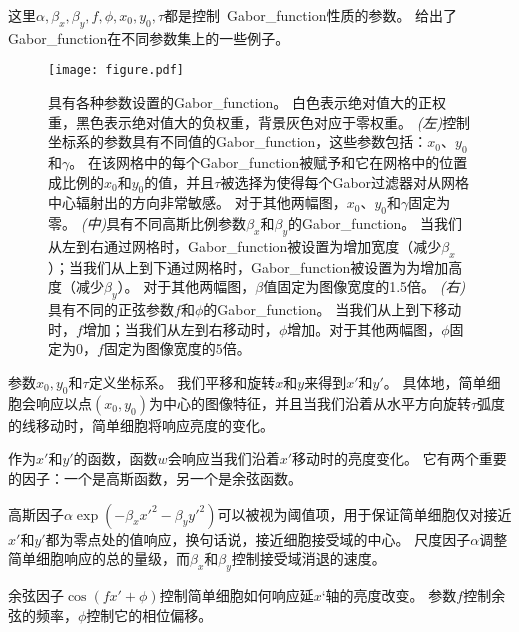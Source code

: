 这里$\alpha, \beta_x, \beta_y, f, \phi, x_0, y_0, \tau$都是控制~\gls{Gabor_function}性质的参数。
给出了\gls{Gabor_function}在不同参数集上的一些例子。
\begin{figure}
\ifOpenSource
\centerline{\texttt{[image: figure.pdf]}}
\else
\centering    
{}     
\fi
\captionsetup{singlelinecheck=off}
\caption{具有各种参数设置的\gls{Gabor_function}。
白色表示绝对值大的正权重，黑色表示绝对值大的负权重，背景灰色对应于零权重。
\emph{(左)}控制坐标系的参数具有不同值的\gls{Gabor_function}，这些参数包括：$x_0$、$y_0$和$\gamma$。
在该网格中的每个\gls{Gabor_function}被赋予和它在网格中的位置成比例的$x_0$和$y_0$的值，并且$\tau$被选择为使得每个Gabor过滤器对从网格中心辐射出的方向非常敏感。
对于其他两幅图，$x_0$、$y_0$和$\gamma$固定为零。
\emph{(中)}具有不同高斯比例参数$\beta_x$和$\beta_y$的\gls{Gabor_function}。
当我们从左到右通过网格时，\gls{Gabor_function}被设置为增加宽度（减少$\beta_x$）；当我们从上到下通过网格时，\gls{Gabor_function}被设置为为增加高度（减少$\beta_y$）。
对于其他两幅图，$\beta$值固定为图像宽度的1.5倍。
\emph{(右)}具有不同的正弦参数$f$和$\phi$的\gls{Gabor_function}。
当我们从上到下移动时，$f$增加；当我们从左到右移动时，$\phi$增加。对于其他两幅图，$\phi$固定为0，$f$固定为图像宽度的5倍。}     
\label{fig:chap9_Gabor_functions}     
\end{figure}

参数$x_0,y_0$和$\tau$定义坐标系。
我们平移和旋转$x$和$y$来得到$x'$和$y'$。
具体地，简单细胞会响应以点$(x_0, y_0)$为中心的图像特征，并且当我们沿着从水平方向旋转$\tau$弧度的线移动时，简单细胞将响应亮度的变化。
 
 
作为$x'$和$y'$的函数，函数$w$会响应当我们沿着$x'$移动时的亮度变化。
它有两个重要的因子：一个是高斯函数，另一个是余弦函数。

高斯因子$ \alpha \exp(-\beta_x x'^2 - \beta_y y'^2)$可以被视为阈值项，用于保证简单细胞仅对接近$x'$和$y'$都为零点处的值响应，换句话说，接近细胞接受域的中心。
尺度因子$\alpha$调整简单细胞响应的总的量级，而$\beta_x$和$\beta_y$控制接受域消退的速度。

余弦因子$ \cos (fx' + \phi)$控制简单细胞如何响应延$x‘$轴的亮度改变。
参数$f$控制余弦的频率，$\phi$控制它的相位偏移。

